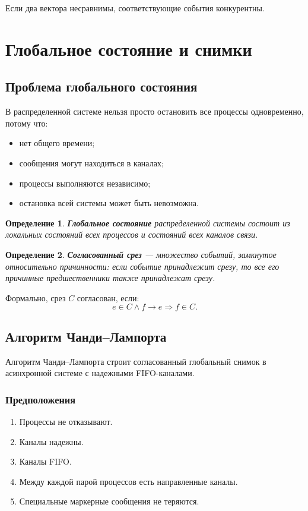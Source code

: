 \documentclass[12pt,a4paper]{article}
\newtheorem{definition}{Определение}
\begin{document}
Если два вектора несравнимы, соответствующие события конкурентны.

\section{Глобальное состояние и снимки}

\subsection{Проблема глобального состояния}

В распределенной системе нельзя просто остановить все процессы одновременно, потому что:
\begin{itemize}
    \item нет общего времени;
    \item сообщения могут находиться в каналах;
    \item процессы выполняются независимо;
    \item остановка всей системы может быть невозможна.
\end{itemize}

\begin{definition}
\textbf{Глобальное состояние} распределенной системы состоит из локальных состояний всех процессов и состояний всех каналов связи.
\end{definition}

\begin{definition}
\textbf{Согласованный срез} --- множество событий, замкнутое относительно причинности: если событие принадлежит срезу, то все его причинные предшественники также принадлежат срезу.
\end{definition}

Формально, срез $C$ согласован, если:
\[
e \in C \land f \rightarrow e \Rightarrow f \in C.
\]

\subsection{Алгоритм Чанди--Лампорта}

Алгоритм Чанди--Лампорта строит согласованный глобальный снимок в асинхронной системе с надежными FIFO-каналами.

\subsubsection{Предположения}

\begin{enumerate}
    \item Процессы не отказывают.
    \item Каналы надежны.
    \item Каналы FIFO.
    \item Между каждой парой процессов есть направленные каналы.
    \item Специальные маркерные сообщения не теряются.
\end{enumerate}
\end{document}
